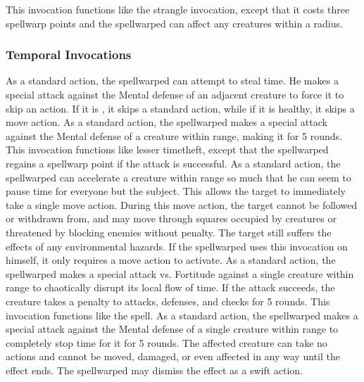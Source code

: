 This invocation functions like the strangle invocation, except that it costs three spellwarp points and the spellwarped can affect any creatures within a \areasmall radius.

\subsubsection{Temporal Invocations}
As a standard action, the spellwarped can attempt to steal time.
He makes a special attack against the Mental defense of an adjacent creature to force it to skip an action.
If it is \bloodied, it skips a standard action, while if it is healthy, it skips a move action.
As a standard action, the spellwarped makes a special attack against the Mental defense of a creature within \rngclose range, making it \slowed for 5 rounds.
This invocation functions like lesser timetheft, except that the spellwarped regains a spellwarp point if the attack is successful.
As a standard action, the spellwarped can accelerate a creature within \rngclose range so much that he can seem to pause time for everyone but the subject.
This allows the target to immediately take a single move action.
During this move action, the target cannot be followed or withdrawn from, and may move through squares occupied by creatures or threatened by blocking enemies without penalty.
The target still suffers the effects of any environmental hazards.
If the spellwarped uses this invocation on himself, it only requires a move action to activate.
As a standard action, the spellwarped makes a special attack vs. Fortitude against a single creature within \rngmed range to chaotically disrupt its local flow of time.
If the attack succeeds, the creature takes a  penalty to attacks, defenses, and checks for 5 rounds.
 This invocation functions like the 
spell.
As a standard action, the spellwarped makes a special attack against the Mental defense of a single creature within \rngclose range to completely stop time for it for 5 rounds.
The affected creature can take no actions and cannot be moved, damaged, or even affected in any way until the effect ends.
The spellwarped may dismiss the effect as a swift action.

